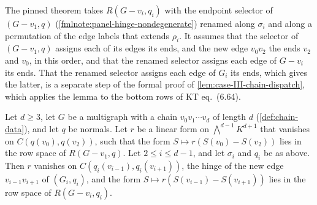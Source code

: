 \begin{fmlnote}
  The pinned theorem takes $R(G - v_i, q_i)$ with the endpoint selector
  of $(G - v_1, q)$ (\cref{fmlnote:panel-hinge-nondegenerate}) renamed
  along $\sigma_i$ and along a permutation of the edge labels that
  extends $\rho_i$. It assumes that the selector of $(G - v_1, q)$
  assigns each of its edges its ends, and the new edge $v_0 v_2$ the
  ends $v_2$ and $v_0$, in this order, and that the renamed selector
  assigns each edge of $G - v_i$ its ends. That the renamed selector
  assigns each edge of $G_i$ its ends, which gives the latter, is a
  separate step of the formal proof of \cref{lem:case-III-chain-dispatch},
  which applies the lemma to the bottom rows of KT eq.~(6.64).
\end{fmlnote}

\begin{lemma}
  \label{lem:case-III-chain-eq666}
  \leanok
  Let $d \ge 3$, let $G$ be a multigraph with a chain
  $v_0 v_1 \cdots v_d$ of length $d$ (\cref{def:chain-data}), and let $q$
  be normals. Let $r$ be a linear form on $\bigwedge^{d-1} K^{d+1}$ that
  vanishes on $C(q(v_0), q(v_2))$, such that the form
  $S \mapsto r(S(v_0) - S(v_2))$ lies in the row space of $R(G - v_1, q)$.
  Let $2 \le i \le d - 1$, and let $\sigma_i$ and $q_i$ be as above. Then
  $r$ vanishes on $C(q_i(v_{i-1}), q_i(v_{i+1}))$, the hinge of the new
  edge $v_{i-1} v_{i+1}$ of $(G_i, q_i)$, and the form
  $S \mapsto r(S(v_{i-1}) - S(v_{i+1}))$ lies in the row space of
  $R(G - v_i, q_i)$.
\end{lemma}
